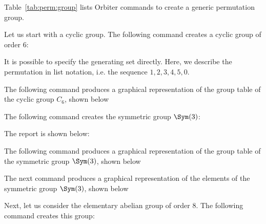 \bigskip

Table~\ref{tab:perm:group} lists Orbiter commands 
to create a generic permutation group.

\bigskip


Let us start with a cyclic group. 
The following command creates a cyclic group of order 6:




It is possible to specify the generating set directly. 
Here, we describe the permutation in list notation, i.e. 
the sequence $1,2,3,4,5,0.$






\bigskip



The following command 
produces a graphical representation 
of the group table of the cyclic group $C_6$, shown below



\bigskip


The following command creates the symmetric group $\Sym(3)$:



The report is shown below:



\bigskip


The following command 
produces a graphical representation 
of the group table of the symmetric group $\Sym(3)$, shown below




\bigskip



The next command 
produces a graphical representation 
of the elements of the symmetric group $\Sym(3)$, shown below

\bigskip

Next, let us consider the elementary abelian group of order 8. 
The following command creates this group:



\bigskip



